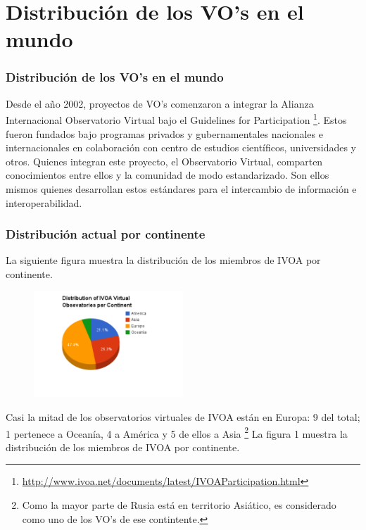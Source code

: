 \section{Distribución de los VO's en el mundo}


\begin{frame}
\frametitle{Distribución de los VO's en el mundo}

Desde el año 2002, proyectos de VO's comenzaron a integrar la Alianza
Internacional Observatorio Virtual bajo el Guidelines for Participation
\footnote{\url{http://www.ivoa.net/documents/latest/IVOAParticipation.html}}.
\newline
\newline
Estos fueron fundados bajo programas privados y gubernamentales nacionales e
internacionales en colaboración con centro de estudios científicos,
universidades y otros. Quienes integran este proyecto, el Observatorio Virtual,
comparten conocimientos entre ellos y la comunidad de modo estandarizado. Son
ellos mismos quienes desarrollan estos estándares para el intercambio de
información e interoperabilidad.

\end{frame}

\newpage

\begin{frame}
\frametitle{Distribución actual por continente}
La siguiente figura muestra la distribución de los miembros de IVOA por continente.
\begin{multicols}{2}
\begin{figure}[h!t]
    \begin{center}
        \includegraphics[width=0.5\textwidth]{img/ivoa_vos_distribution.png}
    \end{center}
\end{figure}

Casi la mitad de los observatorios virtuales de IVOA están en Europa: 9 del
total; 1 pertenece a Oceanía, 4 a América y 5 de ellos a Asia \footnote{Como la
mayor parte de Rusia está en territorio Asiático, es considerado como uno de
los VO's de ese contintente.} La figura 1 muestra la distribución de los
miembros de IVOA por continente.
\end{multicols}
\end{frame}

